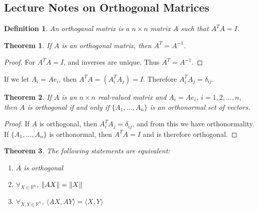 \documentclass{article}
\theoremstyle{mystyle}
\newtheorem{theorem}{Theorem}[section]
\newtheorem{definition}{Definition}[section]
\begin{document}
\subsection{Lecture Notes on Orthogonal Matrices}
\begin{definition}
An orthoganal matrix is a $n\times n$ matrix $A$ such that $A^{T}A = I$.
\end{definition}
\begin{theorem}
If $A$ is an orthogonal matrix, then $A^T = A^{-1}$.
\end{theorem}
\begin{proof}
For $A^TA = I$, and inverses are unique. Thus $A^T = A^{-1}$.
\end{proof}
If we let $A_{i} = Ae_{i}$, then $A^TA = (A_{i}^{T}A_{j}) = I$. Therefore $A_i^TA_j = \delta_{ij}$.
\begin{theorem}
If $A$ is an $n\times n$ real-valued matrix and $A_i = Ae_i$, $i=1,2,\hdots, n$, then $A$ is orthogonal if and only if $\{A_1,\hdots, A_n\}$ is an orthonormal set of vectors.
\end{theorem}
\begin{proof}
If $A$ is orthogonal, then $A_{i}^{T}A_{j} = \delta_{ij}$, and from this we have orthonormality. If $\{A_1,\hdots, A_n\}$ is orthonormal, then $A^TA = I$ and is therefore orthogonal.
\end{proof}
\begin{theorem}
The following statements are equivalent:
\begin{enumerate}
    \item $A$ is orthogonal
    \item $\forall_{X\in\mathbb{R}^{n}}$, $\norm{AX} = \norm{X}$
    \item $\forall_{X,Y\in\mathbb{R}^{n}}$, $\langle AX, AY\rangle = \langle X, Y\rangle$
\end{enumerate}
\end{theorem}
\end{document}
